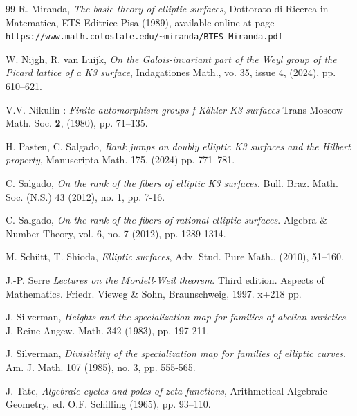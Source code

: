 \documentclass{amsart}
\theoremstyle{definition}
\numberwithin{equation}{section}
\begin{document}
\begin{thebibliography}{99}
 R. Miranda, {\it The basic theory of elliptic surfaces}, Dottorato di Ricerca in Matematica, ETS Editrice Pisa (1989), available online at page \verb|https://www.math.colostate.edu/~miranda/BTES-Miranda.pdf|

W. Nijgh, R. van Luijk,{\it 
On the Galois-invariant part of the Weyl group of the Picard lattice of a K3 surface},
Indagationes Math.,
vo. 35, issue 4,
(2024), pp. 610--621.

 V.V. Nikulin : {\it Finite automorphism groups f K\"ahler K3 surfaces} Trans Moscow Math. Soc. {\bf 2}, (1980), pp. 71--135.

 H. Pasten, C. Salgado, \textit{Rank jumps on doubly elliptic K3 surfaces and the Hilbert property}, Manuscripta Math. 175, (2024) pp. 771--781.

 C. Salgado, \textit{On the rank of the fibers of elliptic K3 surfaces}. Bull. Braz. Math. Soc. (N.S.) 43 (2012), no. 1, pp. 7-16.

 C. Salgado, \textit{On the rank of the fibers of rational elliptic surfaces}. Algebra \& Number Theory, vol. 6, no. 7 (2012), pp. 1289-1314.

 M. Sch\"utt, T. Shioda, \textit{Elliptic surfaces}, Adv. Stud. Pure Math., (2010), 51--160. 

 J.-P. Serre \textit{Lectures on the Mordell-Weil theorem}. Third edition. Aspects of Mathematics. Friedr. Vieweg \& Sohn, Braunschweig, 1997. x+218 pp.

 J. Silverman, \textit{Heights and the specialization map for families of abelian varieties}. J. Reine Angew. Math. 342 (1983), pp. 197-211.

 J. Silverman, \textit{Divisibility of the specialization map for families of elliptic curves.} Am. J.
Math. 107 (1985), no. 3, pp. 555-565.


 J. Tate, \textit{Algebraic cycles and poles of zeta functions}, Arithmetical Algebraic Geometry, ed. O.F. Schilling (1965), pp. 93--110.
\end{thebibliography}
\end{document}
